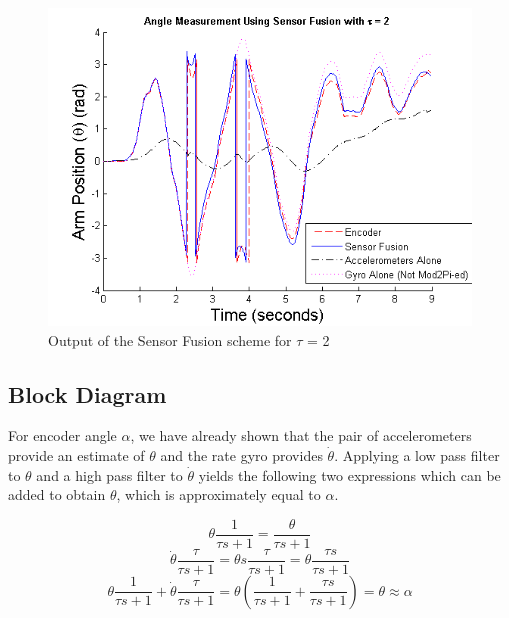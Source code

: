 \documentclass{article}
\theoremstyle{plain}
\theoremstyle{definition}
\theoremstyle{remark}
\begin{document}
\begin{figure}[hbt]
\begin{center}
\includegraphics[width = 12cm]{SF_output_good}
\caption{Output of the Sensor Fusion scheme for $\tau$ = 2}
\label{SF_output_good}
\end{center}
\end{figure}

\clearpage
\subsection{Block Diagram}

For encoder angle $\alpha$, we have already shown that the pair of accelerometers provide an estimate of $\theta$ and the rate gyro provides $\dot{\theta}$.  Applying a low pass filter to $\theta$ and a high pass filter to $\dot{\theta}$ yields the following two expressions which can be added to obtain $\theta$, which is approximately equal to $\alpha$.  

$$ \theta \frac{1}{\tau s + 1} = \frac{\theta}{\tau s + 1} $$
$$ \dot{\theta} \frac{\tau}{\tau s + 1} = \theta s \frac{\tau}{\tau s + 1} = \theta \frac{\tau s}{\tau s + 1} $$
$$ \theta \frac{1}{\tau s + 1} + \dot{\theta} \frac{\tau}{\tau s + 1} = \theta \left(\frac{1}{\tau s + 1} + \frac{\tau s}{\tau s + 1}  \right) = \theta \approx \alpha $$
\end{document}
